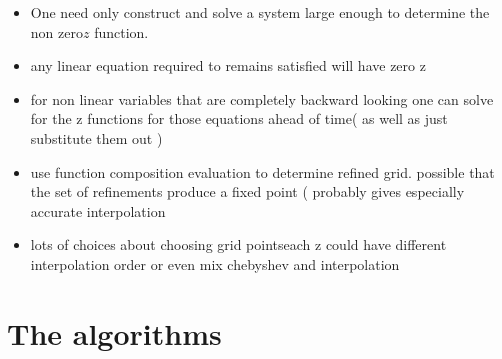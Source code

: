 \documentclass[12pt]{article}
\begin{document}
\begin{itemize}
\item One need only construct and solve a system large enough to determine the non zero$z$ function.
\item any linear equation required to remains satisfied will have zero z
\item for non linear variables that are completely backward looking one can solve for the z functions for those equations 
ahead of time( as well as just substitute them out )
\item use function composition evaluation to determine refined grid. possible that the set of refinements produce a fixed point  ( probably gives especially accurate interpolation
\item lots of choices about choosing grid pointseach z could have different interpolation order or even mix chebyshev and interpolation
\end{itemize}
  






\appendix
\newpage

     
\section{The algorithms}
\label{sec:algorithms}


\end{document}

